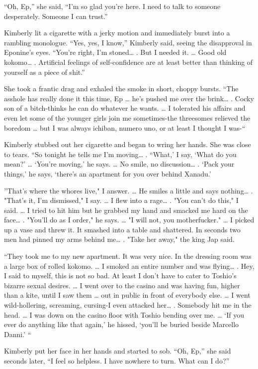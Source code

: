 \documentclass[]{article}
\begin{document}
{“Oh, Ep,” she said, “I’m so glad you’re here.  I need to talk to someone desperately.  Someone I can trust.”

Kimberly lit a cigarette with a jerky motion and immediately burst into a rambling monologue.  “Yes, yes, I know,” Kimberly said, seeing the disapproval in Eponine’s eyes.  “You’re right, I’m stoned… .  But I needed it.  … Good old kokomo… .  Artificial feelings of self-confidence are at least better than thinking of yourself as a piece of shit.”

She took a frantic drag and exhaled the smoke in short, choppy bursts.  “The asshole has really done it this time, Ep … he’s pushed me over the brink… .  Cocky son of a bitch-thinks he can do whatever he wants.  … I tolerated his affairs and even let some of the younger girls join me sometimes-the threesomes relieved the boredom … but I was always ichiban, numero uno, or at least I thought I was-“

Kimberly stubbed out her cigarette and began to wring her hands.  She was close to tears.  “So tonight he tells me I’m moving… .  “What,’ I say, ‘What do you mean?’ … ‘You’re moving,’ he says.  … No smile, no discussion… .  ‘Pack your things,’ he says, ‘there’s an apartment for you over behind Xanadu.’

”That’s where the whores live," I answer.  … He smiles a little and says nothing… .  "That’s it, I’m dismissed," I say.  … I flew into a rage… .  "You can’t do this," I said.  … I tried to hit him but he grabbed my hand and smacked me hard on the face… .  "You’ll do as I order," he says.  … "I will not, you motherfucker." … I picked up a vase and threw it.  It smashed into a table and shattered.  In seconds two men had pinned my arms behind me… .  "Take her away," the king Jap said.

“They took me to my new apartment.  It was very nice.  In the dressing room was a large box of rolled kokomo.  … I smoked an entire number and was flying… .  Hey, I said to myself, this is not so bad.  At least I don’t have to cater to Toshio’s bizarre sexual desires.  … I went over to the casino and was having fun, higher than a kite, until I saw them … out in public in front of everybody else.  … I went wild-hollering, screaming, cursing-I even attacked her… .  Somebody hit me in the head.  … I was down on the casino floor with Toshio bending over me.  … ‘If you ever do anything like that again,’ he hissed, ‘you’ll be buried beside Marcello Danni.’ “

Kimberly put her face in her hands and started to sob.  “Oh, Ep,” she said seconds later, “I feel so helpless.  I have nowhere to turn.  What can I do?”

}
\end{document}
